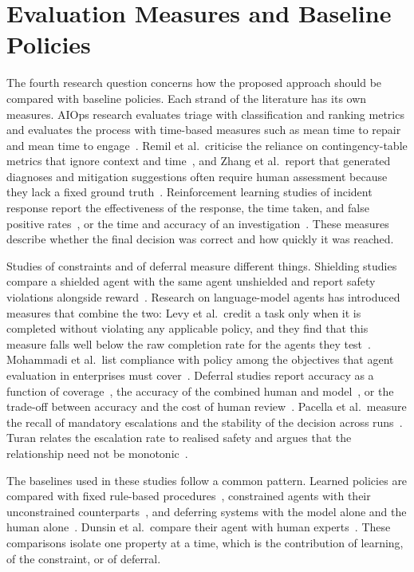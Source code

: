 \section{Evaluation Measures and Baseline Policies}

The fourth research question concerns how the proposed approach should be compared with baseline policies. Each strand of the literature has its own measures. AIOps research evaluates triage with classification and ranking metrics and evaluates the process with time-based measures such as mean time to repair and mean time to engage~\cite{remil2024}. Remil et al.\ criticise the reliance on contingency-table metrics that ignore context and time~\cite{remil2024}, and Zhang et al.\ report that generated diagnoses and mitigation suggestions often require human assessment because they lack a fixed ground truth~\cite{zhang2025}. Reinforcement learning studies of incident response report the effectiveness of the response, the time taken, and false positive rates~\cite{ren2025}, or the time and accuracy of an investigation~\cite{dunsin2025}. These measures describe whether the final decision was correct and how quickly it was reached.

Studies of constraints and of deferral measure different things. Shielding studies compare a shielded agent with the same agent unshielded and report safety violations alongside reward~\cite{alshiekh2018,jansen2020}. Research on language-model agents has introduced measures that combine the two: Levy et al.\ credit a task only when it is completed without violating any applicable policy, and they find that this measure falls well below the raw completion rate for the agents they test~\cite{levy2026}. Mohammadi et al.\ list compliance with policy among the objectives that agent evaluation in enterprises must cover~\cite{mohammadi2025}. Deferral studies report accuracy as a function of coverage~\cite{geifman2019}, the accuracy of the combined human and model~\cite{madras2018}, or the trade-off between accuracy and the cost of human review~\cite{bachar2026}. Pacella et al.\ measure the recall of mandatory escalations and the stability of the decision across runs~\cite{pacella2026}. Turan relates the escalation rate to realised safety and argues that the relationship need not be monotonic~\cite{turan2026}.

The baselines used in these studies follow a common pattern. Learned policies are compared with fixed rule-based procedures~\cite{ren2025,pacella2026}, constrained agents with their unconstrained counterparts~\cite{alshiekh2018,jansen2020,pacella2026}, and deferring systems with the model alone and the human alone~\cite{madras2018,zhang2026falcon}. Dunsin et al.\ compare their agent with human experts~\cite{dunsin2025}. These comparisons isolate one property at a time, which is the contribution of learning, of the constraint, or of deferral.

